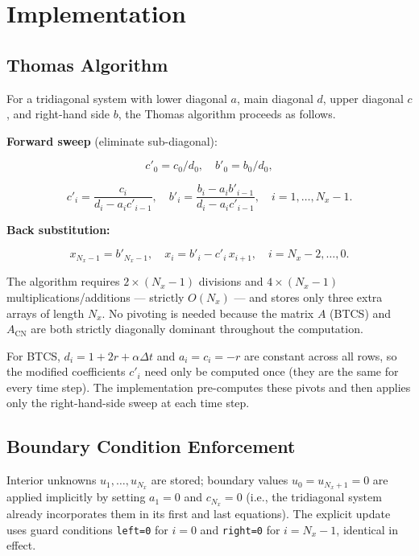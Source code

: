 \documentclass[11pt,a4paper]{article}
\begin{document}
\section{Implementation}

\subsection{Thomas Algorithm}

For a tridiagonal system with lower diagonal $a$, main diagonal $d$, upper diagonal $c$, and right-hand side $b$, the Thomas algorithm proceeds as follows.

\textbf{Forward sweep} (eliminate sub-diagonal):

\begin{equation}
c'_0 = c_0/d_0,\quad b'_0 = b_0/d_0, \tag{44}
\end{equation}

\begin{equation}
c'_i = \frac{c_i}{d_i - a_i c'_{i-1}},\quad b'_i = \frac{b_i - a_i b'_{i-1}}{d_i - a_i c'_{i-1}}, \quad i = 1,\ldots,N_x-1. \tag{45}
\end{equation}

\textbf{Back substitution:}

\begin{equation}
x_{N_x-1} = b'_{N_x-1},\quad x_i = b'_i - c'_i\, x_{i+1}, \quad i = N_x-2,\ldots,0. \tag{46}
\end{equation}

The algorithm requires $2 \times (N_x - 1)$ divisions and $4 \times (N_x - 1)$ multiplications/additions — strictly $O(N_x)$ — and stores only three extra arrays of length $N_x$. No pivoting is needed because the matrix $A$ (BTCS) and $A_{\text{CN}}$ are both strictly diagonally dominant throughout the computation.

For BTCS, $d_i = 1 + 2r + \alpha\Delta t$ and $a_i = c_i = -r$ are constant across all rows, so the modified coefficients $c'_i$ need only be computed once (they are the same for every time step). The implementation pre-computes these pivots and then applies only the right-hand-side sweep at each time step.

\subsection{Boundary Condition Enforcement}

Interior unknowns $u_1,\ldots,u_{N_x}$ are stored; boundary values $u_0 = u_{N_x+1} = 0$ are applied implicitly by setting $a_1 = 0$ and $c_{N_x} = 0$ (i.e., the tridiagonal system already incorporates them in its first and last equations). The explicit update uses guard conditions \texttt{left=0} for $i=0$ and \texttt{right=0} for $i=N_x-1$, identical in effect.
\end{document}
